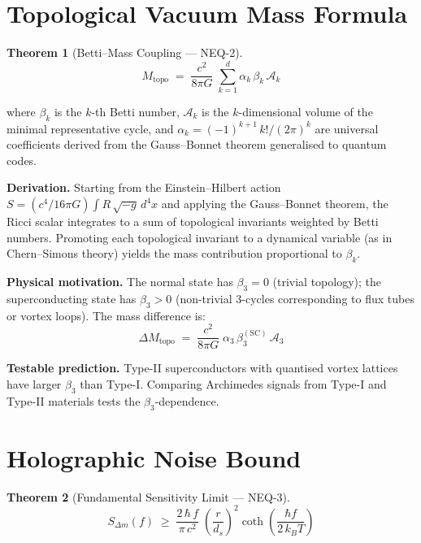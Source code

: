 \documentclass[11pt,a4paper]{article}
\newtheorem{theorem}{Theorem}[section]
\theoremstyle{remark}
\begin{document}
\section{Topological Vacuum Mass Formula}
\label{sec:novel2}

\begin{theorem}[Betti--Mass Coupling --- NEQ-2]
\begin{equation}\label{eq:novel2}
    M_{\text{topo}} \;=\; \frac{c^2}{8\pi G}\;
        \sum_{k=1}^{d} \alpha_k\, \beta_k\, \mathcal{A}_k
\end{equation}
\end{theorem}

where $\beta_k$ is the $k$-th Betti number, $\mathcal{A}_k$ is the $k$-dimensional volume of the minimal representative cycle, and $\alpha_k = (-1)^{k+1}\, k! / (2\pi)^{k}$ are universal coefficients derived from the Gauss--Bonnet theorem generalised to quantum codes.

\textbf{Derivation.}\quad
Starting from the Einstein--Hilbert action $S = (c^4/16\pi G)\int R\,\sqrt{-g}\, d^4x$ and applying the Gauss--Bonnet theorem, the Ricci scalar integrates to a sum of topological invariants weighted by Betti numbers.  Promoting each topological invariant to a dynamical variable (as in Chern--Simons theory) yields the mass contribution proportional to $\beta_k$.

\textbf{Physical motivation.}\quad
The normal state has $\beta_3 = 0$ (trivial topology); the superconducting state has $\beta_3 > 0$ (non-trivial 3-cycles corresponding to flux tubes or vortex loops).  The mass difference is:
\begin{equation}\label{eq:novel2pred}
    \Delta M_{\text{topo}} \;=\; \frac{c^2}{8\pi G}\;
        \alpha_3\, \beta_3^{(\text{SC})}\, \mathcal{A}_3
\end{equation}

\textbf{Testable prediction.}\quad
Type-II superconductors with quantised vortex lattices have larger $\beta_3$ than Type-I.  Comparing Archimedes signals from Type-I and Type-II materials tests the $\beta_3$-dependence.

\section{Holographic Noise Bound}
\label{sec:novel3}

\begin{theorem}[Fundamental Sensitivity Limit --- NEQ-3]
\begin{equation}\label{eq:novel3}
    S_{\Delta m}(f) \;\geq\; \frac{2\,\hbar\, f}{\pi\, c^2}\;
        \left(\frac{r}{d_s}\right)^{\!2}\!
        \coth\!\left(\frac{\hbar f}{2\,k_B T}\right)
\end{equation}
\end{theorem}
\end{document}
